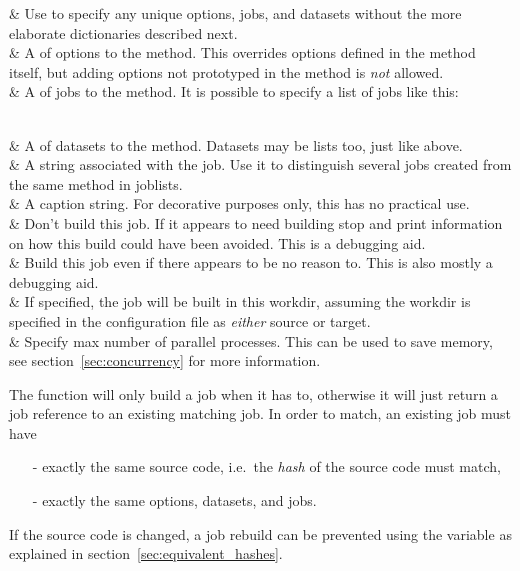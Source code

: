 \RPtwo {} & Use to specify any unique options, jobs, and datasets
    without the more elaborate dictionaries described next.\\

\RPtwo {} & A  of options to the method.
    This overrides options defined in the method itself, but adding
    options not prototyped in the method is \textsl{not} allowed.\\

\RPtwo {} & A  of jobs to the method.
    It is possible to specify a list of jobs like this:

\\

\RPtwo {} & A  of datasets to the method.
    Datasets may be lists too, just like  above.\\

\RPtwo {} & A string associated with the job.  Use it
    to distinguish several jobs created from the same method in
    joblists.\\

\RPtwo {} & A caption string.  For decorative purposes
    only, this has no practical use.\\

\RPtwo {} & Don't build this job. If it appears to
    need building stop and print information on how this build could have
    been avoided. This is a debugging aid.\\

\RPtwo {} & Build this job even if there appears
    to be no reason to. This is also mostly a debugging aid.\\

\RPtwo {} & If specified, the job will be built in
    this workdir, assuming the workdir is specified in the
    configuration file as \textsl{either} source or target.\\

\RPtwo {} & Specify max number of parallel processes.
       This can be used to save memory, see section~\ref{sec:concurrency}
       for more information.\\
\stoptabletwo

The  function will only build a job when it has to,
otherwise it will just return a job reference to an existing matching
job.  In order to match, an existing job must have
\begin{itemize}
\item[-] exactly the same source code, i.e.\ the \textsl{hash} of the source code must match,
\item[-] exactly the same options, datasets, and jobs.
\end{itemize}
If the source code is changed, a job rebuild can be prevented using
the  variable as explained in
section~\ref{sec:equivalent_hashes}.




